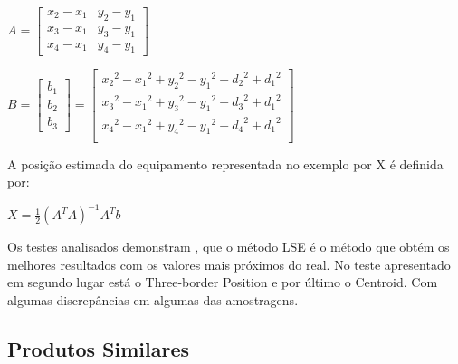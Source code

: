 \begin{center}



$A=\begin{bmatrix}
x_{2}-x_{1} & y_{2}-y_{1}\\
x_{3}-x_{1} & y_{3}-y_{1}\\
x_{4}-x_{1} & y_{4}-y_{1}
\end{bmatrix}$

$B=\begin{bmatrix}
b_{1}\\
b_{2}\\
b_{3}
\end{bmatrix}=\begin{bmatrix}
{x_{2}}^2-{x_{1}}^2  + {y_{2}}^2-{y_{1}}^2 - {d_{2}}^2 + {d_{1}}^2 \\
{x_{3}}^2-{x_{1}}^2  + {y_{3}}^2-{y_{1}}^2 - {d_{3}}^2 + {d_{1}}^2 \\
{x_{4}}^2-{x_{1}}^2  + {y_{4}}^2-{y_{1}}^2 - {d_{4}}^2 + {d_{1}}^2 \\
\end{bmatrix} $

\end{center}

\par A posição estimada do equipamento representada no exemplo por X é definida por:



\par
\begin{center}
$ X= \frac{1}{2}(A^T A)^{-1} A^T b$
\end{center}

\par Os testes analisados demonstram\cite{Wang2013} , que o método LSE é o método que obtém os melhores resultados com os valores mais próximos do real. No teste apresentado em segundo lugar está o Three-border Position e por último o Centroid. Com algumas discrepâncias em algumas das amostragens.

\subsection{Produtos Similares}
